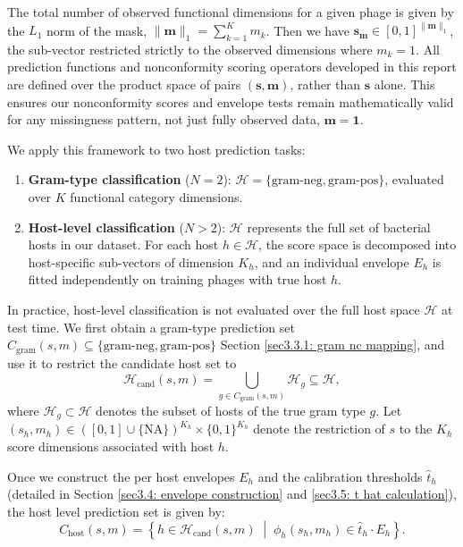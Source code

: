 The total number of observed functional dimensions for a given phage is given by the $L_1$ norm of the mask, 
$\|\mathbf{m}\|_1 = \sum_{k=1}^K m_k$. Then we have $\mathbf{s}_{\mathbf{m}} \in [0,1]^{\|\mathbf{m}\|_1}$, the sub-vector 
restricted strictly to the observed dimensions where $m_k = 1$. All prediction functions and nonconformity 
scoring operators developed in this report are defined over the product space of pairs $(\mathbf{s}, \mathbf{m})$, rather 
than $\mathbf{s}$ alone. This ensures our nonconformity scores and envelope tests remain mathematically valid for any 
missingness pattern, not just fully observed data, $\mathbf{m} = \mathbf{1}$.

We apply this framework to two host prediction tasks:
\begin{enumerate}[label=(\roman*)]
\item \textbf{Gram-type classification} ($N = 2$): $\mathcal{H} = \{\text{gram-neg}, \text{gram-pos}\}$, evaluated over $K$ 
      functional category dimensions.
\item \textbf{Host-level classification} ($N > 2$): $\mathcal{H}$ represents the full set of bacterial hosts in our 
      dataset. For each host $h \in \mathcal{H}$, the score space is decomposed into host-specific sub-vectors of 
      dimension $K_h$, and an individual envelope $E_h$ is fitted independently on training phages with true host $h$.
\end{enumerate}

In practice, host-level classification is not evaluated over the full host space $\mathcal{H}$ at test time. 
We first obtain a gram-type prediction set $C_{\text{gram}}(s, m) \subseteq \{\text{gram-neg}, \text{gram-pos}\}$ 
Section \ref{sec3.3.1: 
gram nc mapping}, and use it to restrict the candidate host set to
\begin{equation*}
\mathcal{H}_{\text{cand}}(s, m) = \bigcup_{g \in C_{\text{gram}}(s, m)} \mathcal{H}_g \subseteq \mathcal{H},
\end{equation*}
where $\mathcal{H}_g \subset \mathcal{H}$ denotes the subset of hosts of the true gram type $g$. Let $(s_h, m_h) \in ([0,1] 
\cup \{\text{NA}\})^{K_h} \times \{0,1\}^{K_h}$ denote the restriction of $s$ to the $K_h$ score dimensions associated with 
host $h$. 

Once we construct the per host envelopes $E_h$ and the calibration thresholds $\hat{t}_h$ (detailed in Section \ref{sec3.4: 
envelope construction} and \ref{sec3.5: t hat calculation}), the host level prediction set is given by:
\begin{equation}
\label{eq: host-prediction-set}
C_{\text{host}}(s, m) = \left\{ h \in \mathcal{H}_{\text{cand}}(s, m) \;\middle|\; \phi_h(s_h, m_h) \in \hat{t}_h \cdot E_h 
\right\}.
\end{equation}

